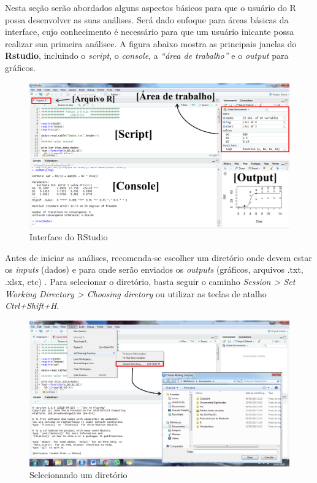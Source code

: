 \documentclass[
]{book}
\begin{document}
Nesta seção serão abordados alguns aspectos básicos para que o usuário do R possa desenvolver as suas análises. Será dado enfoque para áreas básicas da interface, cujo conhecimento é necessário para que um usuário inicante possa realizar sua primeira análisee. A figura abaixo mostra as principais janelas do \textbf{Rstudio}, incluindo o \emph{script}, o \emph{console}, a \emph{``área de trabalho''} e o \emph{output} para gráficos.

\begin{figure}
\centering
\includegraphics{figures/Console.png}
\caption{Interface do RStudio}
\end{figure}

Antes de iniciar as análises, recomenda-se escolher um diretório  onde devem estar os \emph{inputs} (dados) e para onde serão enviados os \emph{outputs} (gráficos, arquivos .txt, .xlsx, etc) . Para selecionar o diretório, basta seguir o caminho \emph{Session \textgreater{} Set Working Directory \textgreater{} Choosing diretory} ou utilizar as teclas de atalho \emph{Ctrl+Shift+H}.

\begin{figure}
\centering
\includegraphics{figures/Diretory.png}
\caption{Selecionando um diretório}
\end{figure}
\end{document}
